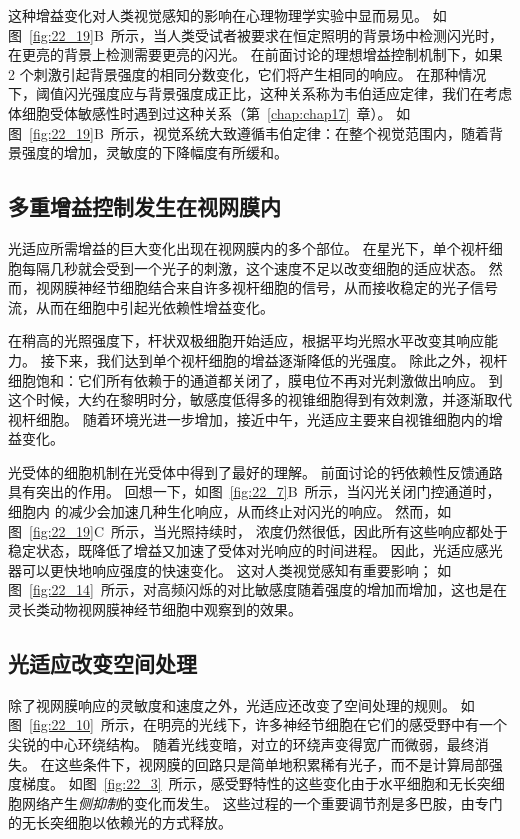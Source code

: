 这种增益变化对人类视觉感知的影响在心理物理学实验中显而易见。
如图~\ref{fig:22_19}B~所示，当人类受试者被要求在恒定照明的背景场中检测闪光时，在更亮的背景上检测需要更亮的闪光。
在前面讨论的理想增益控制机制下，如果 2 个刺激引起背景强度的相同分数变化，它们将产生相同的响应。
在那种情况下，阈值闪光强度应与背景强度成正比，这种关系称为韦伯适应定律，我们在考虑体细胞受体敏感性时遇到过这种关系（第~\ref{chap:chap17}~章）。
如图~\ref{fig:22_19}B~所示，视觉系统大致遵循韦伯定律：在整个视觉范围内，随着背景强度的增加，灵敏度的下降幅度有所缓和。



\subsection{多重增益控制发生在视网膜内}

光适应所需增益的巨大变化出现在视网膜内的多个部位。 
在星光下，单个视杆细胞每隔几秒就会受到一个光子的刺激，这个速度不足以改变细胞的适应状态。
然而，视网膜神经节细胞结合来自许多视杆细胞的信号，从而接收稳定的光子信号流，从而在细胞中引起光依赖性增益变化。


在稍高的光照强度下，杆状双极细胞开始适应，根据平均光照水平改变其响应能力。
接下来，我们达到单个视杆细胞的增益逐渐降低的光强度。
除此之外，视杆细胞饱和：它们所有依赖于的通道都关闭了，膜电位不再对光刺激做出响应。
到这个时候，大约在黎明时分，敏感度低得多的视锥细胞得到有效刺激，并逐渐取代视杆细胞。
随着环境光进一步增加，接近中午，光适应主要来自视锥细胞内的增益变化。


光受体的细胞机制在光受体中得到了最好的理解。
前面讨论的钙依赖性反馈通路具有突出的作用。
回想一下，如图~\ref{fig:22_7}B~所示，当闪光关闭门控通道时，细胞内  的减少会加速几种生化响应，从而终止对闪光的响应。
然而，如图~\ref{fig:22_19}C~所示，当光照持续时， 浓度仍然很低，因此所有这些响应都处于稳定状态，既降低了增益又加速了受体对光响应的时间进程。
因此，光适应感光器可以更快地响应强度的快速变化。
这对人类视觉感知有重要影响；
如图~\ref{fig:22_14}~所示，对高频闪烁的对比敏感度随着强度的增加而增加，这也是在灵长类动物视网膜神经节细胞中观察到的效果。



\subsection{光适应改变空间处理}

除了视网膜响应的灵敏度和速度之外，光适应还改变了空间处理的规则。
如图~\ref{fig:22_10}~所示，在明亮的光线下，许多神经节细胞在它们的感受野中有一个尖锐的中心环绕结构。 
随着光线变暗，对立的环绕声变得宽广而微弱，最终消失。
在这些条件下，视网膜的回路只是简单地积累稀有光子，而不是计算局部强度梯度。
如图~\ref{fig:22_3}~所示，感受野特性的这些变化由于水平细胞和无长突细胞网络产生\textit{侧抑制}的变化而发生。
这些过程的一个重要调节剂是多巴胺，由专门的无长突细胞以依赖光的方式释放。


